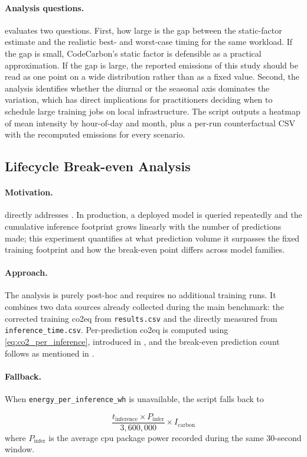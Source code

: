 \paragraph{Analysis questions.}
 evaluates two questions. First, how large is the gap between the static-factor estimate and the realistic best- and worst-case timing for the same workload. If the gap is small, CodeCarbon's static factor is defensible as a practical approximation. If the gap is large, the reported emissions of this study should be read as one point on a wide distribution rather than as a fixed value. Second, the analysis identifies whether the diurnal or the seasonal axis dominates the variation, which has direct implications for practitioners deciding when to schedule large training jobs on local infrastructure. The script outputs a heatmap of mean intensity by hour-of-day and month, plus a per-run counterfactual CSV with the recomputed emissions for every scenario.

\subsection{Lifecycle Break-even Analysis}
\label{design_lifecycle}\label{exp:5}

\paragraph{Motivation.}
 directly addresses . In production, a deployed model is queried repeatedly and the cumulative inference footprint grows linearly with the number of predictions made; this experiment quantifies at what prediction volume it surpasses the fixed training footprint and how the break-even point differs across model families.

\paragraph{Approach.}
The analysis is purely post-hoc and requires no additional training runs. It combines two data sources already collected during the main benchmark: the corrected training \gls{co2eq} from \texttt{results.csv} and the directly measured  from \texttt{inference\_time.csv}. Per-prediction \gls{co2eq} is computed using \eqref{eq:co2_per_inference}, introduced in , and the break-even prediction count follows as mentioned in .

\paragraph{Fallback.}
When \texttt{energy\_per\_inference\_wh} is unavailable, the script falls back to

\begin{equation}
\frac{t_{\text{inference}} \times P_{\text{infer}}}{3{,}600{,}000} \times I_{\text{carbon}}
\end{equation}
where $P_{\text{infer}}$ is the average \gls{cpu} package power recorded during the same 30-second window.
